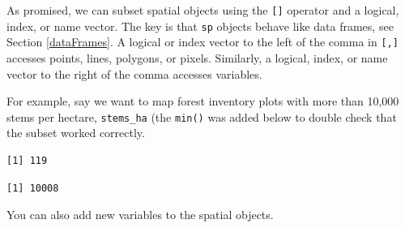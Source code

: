 \documentclass[]{krantz}
\makeatletter
\newenvironment{Shaded}{\begin{snugshade}}{\end{snugshade}}
\newcommand{\KeywordTok}[1]{\textcolor[rgb]{0.27,0.27,0.27}{\textbf{#1}}}
\newcommand{\DecValTok}[1]{\textcolor[rgb]{0.06,0.06,0.06}{#1}}
\newcommand{\FloatTok}[1]{\textcolor[rgb]{0.06,0.06,0.06}{#1}}
\newcommand{\StringTok}[1]{\textcolor[rgb]{0.5,0.5,0.5}{#1}}
\newcommand{\OperatorTok}[1]{\textcolor[rgb]{0.43,0.43,0.43}{\textbf{#1}}}
\newcommand{\ErrorTok}[1]{\textcolor[rgb]{0.14,0.14,0.14}{\textbf{#1}}}
\newcommand{\NormalTok}[1]{#1}
\newenvironment{kframe}{%
\medskip{}
\setlength{\fboxsep}{.8em}
 \def\at@end@of@kframe{}%
 \ifinner\ifhmode%
  \def\at@end@of@kframe{\end{minipage}}%
  \begin{minipage}{\columnwidth}%
 \fi\fi%
 \def\FrameCommand##1{\hskip\@totalleftmargin \hskip-\fboxsep
 \colorbox{shadecolor}{##1}\hskip-\fboxsep
     \hskip-\linewidth \hskip-\@totalleftmargin \hskip\columnwidth}%
 \MakeFramed {\advance\hsize-\width
   \@totalleftmargin\z@ \linewidth\hsize
   \@setminipage}}%
 {\par\unskip\endMakeFramed%
 \at@end@of@kframe}
\renewenvironment{Shaded}{\begin{kframe}}{\end{kframe}}
\makeatother
\begin{document}
As promised, we can subset spatial objects using the \texttt{{[}{]}}
operator and a logical, index, or name vector. The key is that
\texttt{sp} objects behave like data frames, see Section
\ref{dataFrames}. A logical or index vector to the left of the comma in
\texttt{{[},{]}} accesses points, lines, polygons, or pixels. Similarly,
a logical, index, or name vector to the right of the comma accesses
variables.

For example, say we want to map forest inventory plots with more than
10,000 stems per hectare, \texttt{stems\_ha} (the \texttt{min()} was
added below to double check that the subset worked correctly.

\begin{Shaded}
\end{Shaded}

\begin{verbatim}
[1] 119
\end{verbatim}

\begin{Shaded}
\end{Shaded}

\begin{verbatim}
[1] 10008
\end{verbatim}

You can also add new variables to the spatial objects.

\begin{Shaded}
\end{Shaded}
\end{document}
